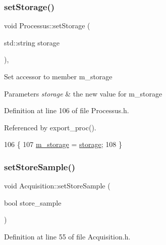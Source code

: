 \subsubsection{\texorpdfstring{set\+Storage()}{setStorage()}}
{\footnotesize\ttfamily void Processus\+::set\+Storage (\begin{DoxyParamCaption}\item[{std\+::string}]{storage }\end{DoxyParamCaption})\hspace{0.3cm}{\ttfamily [inline]}, {\ttfamily [inherited]}}

Set accessor to member m\+\_\+storage 
\begin{DoxyParams}{Parameters}
{\em storage} & the new value for m\+\_\+storage \\
\hline
\end{DoxyParams}


Definition at line 106 of file Processus.\+h.



Referenced by export\+\_\+proc().


\begin{DoxyCode}
106                                       \{
107     \hyperlink{classProcessus_a132b1e71f72327e5a87f0a168c7b6325}{m\_storage} = \hyperlink{classProcessus_a33fa1a0b54a636e5cdd680669fd9ea51}{storage};
108   \}
\end{DoxyCode}
\mbox{\label{classAcquisition_af36a1b660244096b7d274f591f67b695}} 
\subsubsection{\texorpdfstring{set\+Store\+Sample()}{setStoreSample()}\hspace{0.1cm}{\footnotesize\ttfamily [1/2]}}
{\footnotesize\ttfamily void Acquisition\+::set\+Store\+Sample (\begin{DoxyParamCaption}\item[{bool}]{store\+\_\+sample }\end{DoxyParamCaption})\hspace{0.3cm}{\ttfamily [inline]}}



Definition at line 55 of file Acquisition.\+h.



